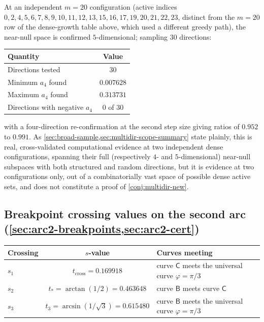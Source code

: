 \documentclass[11pt,reqno]{amsart}
\renewcommand{\_}{\origunderscore\allowbreak}
\numberwithin{equation}{section}
\theoremstyle{plain}
\theoremstyle{definition}
\theoremstyle{remark}
\newcommand{\tilt}{\varphi}                  %
\newcommand{\arcp}{s}                        %
\begin{document}
At an independent $m=20$ configuration (active indices
$0,2,4,5,6,7,8,9,10,11,12,13,$\linebreak$15,16,17,19,20,21,22,23$, distinct from
the $m=20$ row of the dense-growth table above, which used a different
greedy path), the near-null space is confirmed $5$-dimensional; sampling
$30$ directions:
\begin{center}
\begin{tabular}{lc}
\toprule
Quantity & Value\\
\midrule
Directions tested & $30$\\
Minimum $a_4$ found & $0.007628$\\
Maximum $a_4$ found & $0.313731$\\
Directions with negative $a_4$ & $0$ of $30$\\
\bottomrule
\end{tabular}
\end{center}
with a four-direction re-confirmation at the second step size giving
ratios of $0.952$ to $0.991$. As \cref{sec:broad-sample,sec:multidir-scope-summary}
state plainly, this is real, cross-validated computational evidence at
two independent dense configurations, spanning their full (respectively
$4$- and $5$-dimensional) near-null subspaces with both structured and
random directions, but it is evidence at two configurations only, out
of a combinatorially vast space of possible dense active sets, and does
not constitute a proof of \cref{conj:multidir-new}.

\subsection{Breakpoint crossing values on the second arc (\cref{sec:arc2-breakpoints,sec:arc2-cert})}

\begin{center}
\begin{tabular}{lcl}
\toprule
Crossing & $\arcp$-value & Curves meeting\\
\midrule
$\arcp_1$ & $t_{\mathrm{cross}}=0.169918$ & curve $\mathsf C$ meets the universal curve $\tilt=\pi/3$\\
$\arcp_2$ & $t_*=\arctan(1/2)=0.463648$ & curve $\mathsf B$ meets curve $\mathsf C$\\
$\arcp_3$ & $t_3=\arcsin(1/\sqrt3)=0.615480$ & curve $\mathsf B$ meets the universal curve $\tilt=\pi/3$\\
\bottomrule
\end{tabular}
\end{center}
\end{document}
